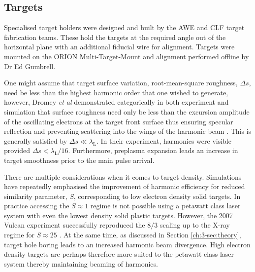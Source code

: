 


\subsection{Targets}
Specialised target holders were designed and built by the AWE and CLF target fabrication teams. These hold the targets at the required angle out of the horizontal plane with an additional fiducial wire for alignment. Targets were mounted on the ORION Multi-Target-Mount and alignment performed offline by Dr Ed Gumbrell.

One might assume that target surface variation, root-mean-square roughness, $\Delta s$, need be less than the highest harmonic order that one wished to generate, however, Dromey \textit{et al} demonstrated categorically in both experiment and simulation that surface roughness need only be less than the excursion amplitude of the oscillating electrons at the target front surface thus ensuring specular reflection and preventing scattering into the wings of the harmonic beam \cite{dromeyDiffractionlimitedPerformanceFocusing2009}. This is generally satisfied by $\Delta s \ll \lambda_\mathrm{L}$. In their experiment, harmonics were visible provided $\Delta s < \lambda_\mathrm{L}/16$. Furthermore, preplasma expansion leads an increase in target smoothness prior to the main pulse arrival.

There are multiple considerations when it comes to target density. Simulations have repeatedly emphasised the improvement of harmonic efficiency for reduced similarity parameter, $S$, \cite{gonoskovUltrarelativisticNanoplasmonicsRoute2011, edwardsXRayEmissionEffectiveness2020} corresponding to low electron density solid targets. In practice accessing the $S\approx 1$ regime is not possible using a petawatt class laser system with even the lowest density solid plastic targets. However, the 2007 Vulcan experiment successfully reproduced the $8/3$ scaling up to the X-ray regime for $S \approx 25 $ \cite{dromeyBrightMultikeVHarmonic2007}. At the same time, as discussed in Section \ref{ch:3-sec:theory}, target hole boring leads to an increased harmonic beam divergence. High electron density targets are perhaps therefore more suited to the petawatt class laser system thereby maintaining beaming of harmonics.

